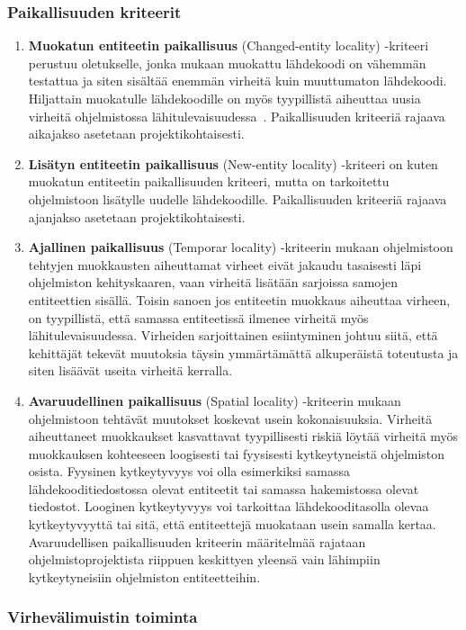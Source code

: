 \documentclass[finnish]{tktltiki2}
\theoremstyle{definition}
\theoremstyle{remark}
\begin{document}
\subsubsection{Paikallisuuden kriteerit}

\begin{enumerate}
  \item \textbf{Muokatun entiteetin paikallisuus} (Changed-entity locality) -kriteeri perustuu oletukselle, jonka mukaan muokattu lähdekoodi on vähemmän testattua ja siten sisältää enemmän virheitä kuin muuttumaton lähdekoodi. Hiljattain muokatulle lähdekoodille on myös tyypillistä aiheuttaa uusia virheitä ohjelmistossa lähitulevaisuudessa~\cite{NB05, GKMS00}. Paikallisuuden kriteeriä rajaava aikajakso asetetaan projektikohtaisesti.
  \item \textbf{Lisätyn entiteetin paikallisuus} (New-entity locality) -kriteeri on kuten muokatun entiteetin paikallisuuden kriteeri, mutta on tarkoitettu ohjelmistoon lisätylle uudelle lähdekoodille. Paikallisuuden kriteeriä rajaava ajanjakso asetetaan projektikohtaisesti.
  \item \textbf{Ajallinen paikallisuus} (Temporar locality) -kriteerin mukaan ohjelmistoon tehtyjen muokkausten aiheuttamat virheet eivät jakaudu tasaisesti läpi ohjelmiston kehityskaaren, vaan virheitä lisätään sarjoissa samojen entiteettien sisällä. Toisin sanoen jos entiteetin muokkaus aiheuttaa virheen, on tyypillistä, että samassa entiteetissä ilmenee virheitä myös lähitulevaisuudessa. Virheiden sarjoittainen esiintyminen johtuu siitä, että kehittäjät tekevät muutoksia täysin ymmärtämättä alkuperäistä toteutusta ja siten lisäävät useita virheitä kerralla.
  \item \textbf{Avaruudellinen paikallisuus} (Spatial locality) -kriteerin mukaan ohjelmistoon tehtävät muutokset koskevat usein kokonaisuuksia. Virheitä aiheuttaneet muokkaukset kasvattavat tyypillisesti riskiä löytää virheitä myös muokkauksen kohteeseen loogisesti tai fyysisesti kytkeytyneistä ohjelmiston osista. Fyysinen kytkeytyvyys voi olla esimerkiksi samassa lähdekooditiedostossa olevat entiteetit tai samassa hakemistossa olevat tiedostot. Looginen kytkeytyvyys voi tarkoittaa lähdekooditasolla olevaa kytkeytyvyyttä tai sitä, että entiteettejä muokataan usein samalla kertaa. Avaruudellisen paikallisuuden kriteerin määritelmää rajataan ohjelmistoprojektista riippuen keskittyen yleensä vain lähimpiin kytkeytyneisiin ohjelmiston entiteetteihin.
\end{enumerate}

\subsubsection{Virhevälimuistin toiminta}
\end{document}
